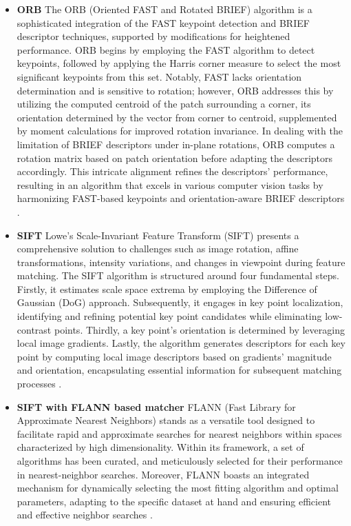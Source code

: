 \begin{itemize}
  \item \textbf{ORB}\newline
  The ORB (Oriented FAST and Rotated BRIEF) algorithm is a sophisticated integration of the FAST keypoint detection and BRIEF descriptor techniques, supported by modifications for heightened performance. ORB begins by employing the FAST algorithm to detect keypoints, followed by applying the Harris corner measure to select the most significant keypoints from this set. Notably, FAST lacks orientation determination and is sensitive to rotation; however, ORB addresses this by utilizing the computed centroid of the patch surrounding a corner, its orientation determined by the vector from corner to centroid, supplemented by moment calculations for improved rotation invariance. In dealing with the limitation of BRIEF descriptors under in-plane rotations, ORB computes a rotation matrix based on patch orientation before adapting the descriptors accordingly. This intricate alignment refines the descriptors' performance, resulting in an algorithm that excels in various computer vision tasks by harmonizing FAST-based keypoints and orientation-aware BRIEF descriptors \cite{6126544}.
  \item \textbf{SIFT}\newline
  Lowe's Scale-Invariant Feature Transform (SIFT) presents a comprehensive solution to challenges such as image rotation, affine transformations, intensity variations, and changes in viewpoint during feature matching. The SIFT algorithm is structured around four fundamental steps. Firstly, it estimates scale space extrema by employing the Difference of Gaussian (DoG) approach. Subsequently, it engages in key point localization, identifying and refining potential key point candidates while eliminating low-contrast points. Thirdly, a key point's orientation is determined by leveraging local image gradients. Lastly, the algorithm generates descriptors for each key point by computing local image descriptors based on gradients' magnitude and orientation, encapsulating essential information for subsequent matching processes \cite{lowe1999object}.
  \item \textbf{SIFT with FLANN based matcher}\newline
  FLANN (Fast Library for Approximate Nearest Neighbors) stands as a versatile tool designed to facilitate rapid and approximate searches for nearest neighbors within spaces characterized by high dimensionality. Within its framework, a set of algorithms has been curated, and meticulously selected for their performance in nearest-neighbor searches. Moreover, FLANN boasts an integrated mechanism for dynamically selecting the most fitting algorithm and optimal parameters, adapting to the specific dataset at hand and ensuring efficient and effective neighbor searches \cite{6809191}.
\end{itemize}

